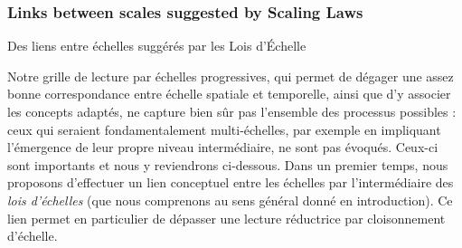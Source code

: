 




\subsubsection{Links between scales suggested by Scaling Laws}{Des liens entre échelles suggérés par les Lois d'Échelle}






Notre grille de lecture par échelles progressives, qui permet de dégager une assez bonne correspondance entre échelle spatiale et temporelle, ainsi que d'y associer les concepts adaptés, ne capture bien sûr pas l'ensemble des processus possibles : ceux qui seraient fondamentalement multi-échelles, par exemple en impliquant l'émergence de leur propre niveau intermédiaire, ne sont pas évoqués. Ceux-ci sont importants et nous y reviendrons ci-dessous. Dans un premier temps, nous proposons d'effectuer un lien conceptuel entre les échelles par l'intermédiaire des \emph{lois d'échelles} (que nous comprenons au sens général donné en introduction). Ce lien permet en particulier de dépasser une lecture réductrice par cloisonnement d'échelle.


